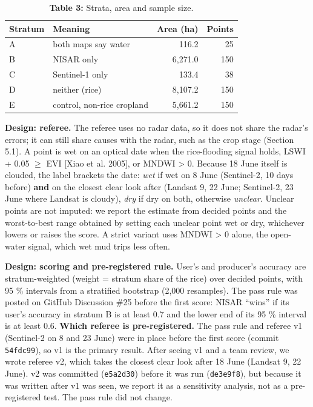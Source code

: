 \documentclass[10pt,twocolumn]{article}
\begin{document}
\begin{table}[tbp]
\centering
\caption{\textbf{Table 3:} Strata, area and sample size.}
\footnotesize
\begin{tabularx}{\textwidth}{LLrr}
\toprule
\textbf{Stratum} & \textbf{Meaning} & \textbf{Area (ha)} & \textbf{Points} \\
\midrule
{}A & both maps say water & 116.2 & 25 \\
{}B & NISAR only & 6,271.0 & 150 \\
{}C & Sentinel-1 only & 133.4 & 38 \\
{}D & neither (rice) & 8,107.2 & 150 \\
{}E & control, non-rice cropland & 5,661.2 & 150 \\
\bottomrule
\end{tabularx}
\end{table}

\textbf{Design: referee.} The referee uses no radar data, so it does not share the radar's errors; it can still share causes with the radar, such as the crop stage (Section 5.1). A point is wet on an optical date when the rice-flooding signal holds, LSWI + 0.05 $\geq$ EVI [Xiao et al. 2005], or MNDWI > 0. Because 18 June itself is clouded, the label brackets the date: \emph{wet} if wet on 8 June (Sentinel-2, 10 days before) \textbf{and} on the closest clear look after (Landsat 9, 22 June; Sentinel-2, 23 June where Landsat is cloudy), \emph{dry} if dry on both, otherwise \emph{unclear}. Unclear points are not imputed: we report the estimate from decided points and the worst-to-best range obtained by setting each unclear point wet or dry, whichever lowers or raises the score. A strict variant uses MNDWI > 0 alone, the open-water signal, which wet mud trips less often.

\textbf{Design: scoring and pre-registered rule.} User's and producer's accuracy are stratum-weighted (weight = stratum share of the rice) over decided points, with 95 \% intervals from a stratified bootstrap (2,000 resamples). The pass rule was posted on GitHub Discussion \#25 before the first score: NISAR ``wins'' if its user's accuracy in stratum B is at least 0.7 and the lower end of its 95 \% interval is at least 0.6. \textbf{Which referee is pre-registered.} The pass rule and referee v1 (Sentinel-2 on 8 and 23 June) were in place before the first score (commit \texttt{54fdc99}), so v1 is the primary result. After seeing v1 and a team review, we wrote referee v2, which takes the closest clear look after 18 June (Landsat 9, 22 June). v2 was committed (\texttt{e5a2d30}) before it was run (\texttt{de3e9f8}), but because it was written after v1 was seen, we report it as a sensitivity analysis, not as a pre-registered test. The pass rule did not change.
\end{document}
